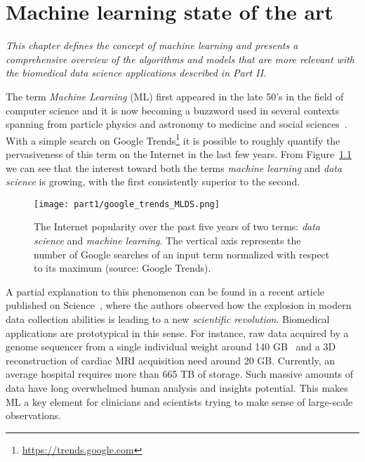 
\chapter{Machine learning state of the art} \label{chap:state-of-the-art}

\begin{displayquote}
\textit{This chapter defines the concept of machine learning and presents a comprehensive overview of the algorithms and models that are more relevant with the biomedical data science applications described in Part II.}
\end{displayquote}

The term \textit{Machine Learning} (ML) first appeared in the late 50's in the field of computer science and it is now becoming a buzzword used in several contexts spanning from particle physics and astronomy to medicine and social sciences~\cite{service2017ai}.
With a simple search on Google Trends\footnote{\url{https://trends.google.com}} it is possible to roughly quantify the pervasiveness of this term on the Internet in the last few years. From Figure~\ref{fig:google_trend_ML} we can see that the interest toward both the terms \textit{machine learning} and \textit{data science} is growing, with the first consistently superior to the second.

\begin{figure}[h!]
  \centering
    \texttt{[image: part1/google\_trends\_MLDS.png]}
  \caption{The Internet popularity over the past five years of two terms: \textit{data science} and \textit{machine learning}. The vertical axis represents the number of Google searches of an input term normalized with respect to its maximum (source: Google Trends).} \label{fig:google_trend_ML}
\end{figure}

A partial explanation to this phenomenon can be found in a recent article published on Science~\cite{appenzeller2017revolution}, where the authors observed how the explosion in modern data collection abilities is leading to a new \textit{scientific revolution}.
Biomedical applications are prototypical in this sense. For instance, raw data acquired by a genome sequencer from a single individual weight around 140 GB~\cite{marx2013biology} and a 3D reconstruction of cardiac MRI acquisition need around 20 GB. Currently, an average hospital requires more than 665 TB of storage.
Such massive amounts of data have long overwhelmed human analysis and insights potential. This makes ML a key element for clinicians and scientists trying to make sense of large-scale observations.

